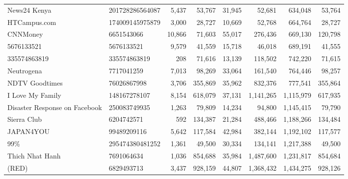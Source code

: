 \begin{longtable}{llrrrrrr}
                                      News24 Kenya &  201728286564087 &   5,437 &      53,767 &     31,945 &      52,681 &       634,048 &     53,764 \\
                                      HTCampus.com &  174009145975879 &   3,000 &      28,727 &     10,669 &      52,768 &       664,764 &     28,727 \\
                                          CNNMoney &       6651543066 &  10,866 &      71,603 &     55,017 &     276,436 &       669,130 &    120,798 \\
                                        5676133521 &       5676133521 &   9,579 &      41,559 &     15,718 &      46,018 &       689,191 &     41,555 \\
                                      335574863819 &     335574863819 &     208 &      71,616 &     13,139 &     118,502 &       742,220 &     71,615 \\
                                        Neutrogena &       7717041259 &   7,013 &      98,269 &     33,064 &     161,540 &       764,446 &     98,257 \\
                                    NDTV Goodtimes &      76026867998 &   3,706 &     355,869 &     35,962 &     832,376 &       777,541 &    355,864 \\
                                  I Love My Family &     148167278107 &   8,154 &     618,079 &     37,131 &   1,141,265 &     1,115,979 &    617,935 \\
                     Disaster Response on Facebook &     250083749935 &   1,263 &      79,809 &     14,234 &      94,800 &     1,145,415 &     79,790 \\
                                       Sierra Club &       6204742571 &     592 &     134,387 &     21,284 &     488,466 &     1,188,266 &    134,484 \\
                                         JAPAN4YOU &      99489209116 &   5,642 &     117,584 &     42,984 &     382,144 &     1,192,102 &    117,577 \\
                                              99\% &  295474380481252 &   1,361 &      49,500 &     30,334 &     134,141 &     1,217,388 &     49,500 \\
                                   Thich Nhat Hanh &       7691064634 &   1,036 &     854,688 &     35,984 &   1,487,600 &     1,231,817 &    854,684 \\
                                             (RED) &       6829493713 &   3,437 &     928,159 &     44,807 &   1,368,432 &     1,434,275 &    928,126 \\

\end{longtable}
